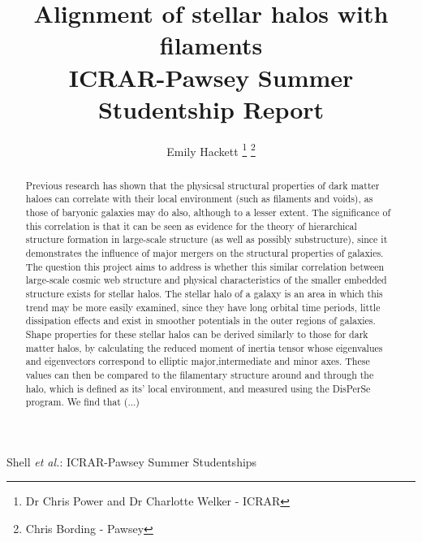\documentclass[journal]{IEEEtran}
\begin{document}
\title{Alignment of stellar halos with filaments
\\ICRAR-Pawsey Summer Studentship Report}

\author{Emily Hackett%
\thanks{Dr Chris Power and Dr Charlotte Welker - ICRAR}
\thanks{Chris Bording - Pawsey}}

%
{Shell \MakeLowercase{\textit{et al.}}: ICRAR-Pawsey Summer Studentships}

\maketitle

\begin{abstract}
	Previous research has shown that the physicsal structural properties of dark matter haloes can correlate with their local environment (such as filaments and voids), as those of baryonic galaxies may do also, although to a lesser extent. The significance of this correlation is that it can be seen as evidence for the theory of hierarchical structure formation in large-scale structure (as well as possibly substructure), since it demonstrates the influence of major mergers on the structural properties of galaxies. The question this project aims to address is whether this similar correlation between large-scale cosmic web structure and physical characteristics of the smaller embedded structure exists for stellar halos. The stellar halo of a galaxy is an area in which this trend may be more easily examined, since they have long orbital time periods, little dissipation effects and exist in smoother potentials in the outer regions of galaxies. Shape properties for these stellar halos can be derived similarly to those for dark matter halos, by calculating the reduced moment of inertia tensor whose eigenvalues and eigenvectors correspond to elliptic major,intermediate and minor axes. These values can then be compared to the filamentary structure around and through the halo, which is defined as its' local environment, and measured using the DisPerSe program. We find that (...) 
\end{abstract}

\IEEEpeerreviewmaketitle
\end{document}
